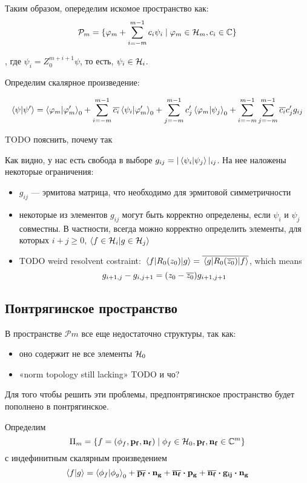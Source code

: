 Таким образом, опеределим искомое пространство как:
\[
\mathcal{P}_m = 
\{ \varphi_m + \sum\limits_{i = -m}^{m - 1} c_i \psi_i \mid \varphi_m \in \mathcal{H}_{m}, c_i \in \mathbb{C}\}
\]

, где $\psi_i = Z_0^{m + i + 1} \psi$, то есть, $\psi_i \in \mathcal{H}_{i}$.

Определим скалярное произведение:

\[
\ip{\psi}{\psi'} =
\ip{\varphi_m}{\varphi'_m}_0 +
\sum\limits_{i = -m}^{m - 1} \cconj{c_i} \ip{\psi_i}{\varphi'_m}_0 +
\sum\limits_{j = -m}^{m - 1} c'_j \ip{\varphi_m}{\psi_j}_0 +
\sum\limits_{i = -m}^{m - 1} \sum\limits_{j = -m}^{m - 1} \cconj{c_i} c_j' g_{ij}
\]

TODO пояснить, почему так

Как видно, у нас есть свобода в выборе $g_{ij} = | \ip{\psi_i}{\psi_j} |_{ij}$. На нее наложены некоторые ограничения:

\begin{itemize}
\item $g_{ij}$ — эрмитова матрица, что необходимо для эрмитовой симметричности
\item некоторые из элементов $g_{ij}$ могут быть корректно определены, если $\psi_i$ и $\psi_j$ совместны. В частности, всегда можно корректно определить элементы, для которых $i + j \ge 0$, $\ip{f \in \hilb{i}}{g \in \hilb{j}}$
\item TODO weird resolvent costraint: $\mel{f}{R_0(z_0)}{g} = \overline{\mel{g}{R_0(\overline{z_0})}{f}}$, which means
\[
g_{i + 1, j} - g_{i, j + 1} = (z_0 - \overline{z_0}) g_{i + 1, j + 1}
\]
\end{itemize}

\subsection{Понтрягинское пространство}
В пространстве $\mathcal{P}{m}$ все еще недостаточно структуры, так как:
\begin{itemize}
\item оно содержит не все элементы $\mathcal{H}_{0}$
\item «norm topology still lacking» TODO и чо?
\end{itemize}

Для того чтобы решить эти проблемы, предпонтрягинское пространство будет пополнено в понтрягинское.

Определим 
\[
\Pi_m = \{f = (\phi_f, \vb{p_f}, \vb{n_f}) \mid \phi_f \in \mathcal{H}_{0}, \vb{p_f}, \vb{n_f} \in \mathbb{C}^m \}
\]
с индефинитным скалярным произведением
\[
\ip{f}{g} =
\ip{\phi_f}{\phi_g}_0 +
\cconj{\vb{p_f}} \vdot \vb{n_g} +
\cconj{\vb{n_f}} \vdot \vb{p_g} + 
\cconj{\vb{n_f}} \vdot \vb{g_{ij}} \vdot \vb{n_g}
\]

